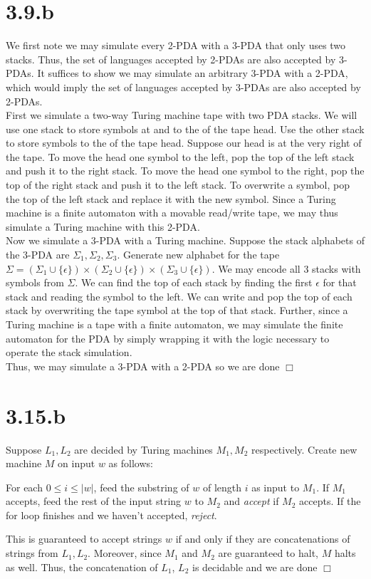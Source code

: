 \documentclass{article}
\newenvironment{myindentpar}[1]
  {\begin{list}{}
          {\setlength{\leftmargin}{#1}\setlength{\rightmargin}{#1}}
          \item[]
  }
  {\end{list}}
\begin{document}
\section*{3.9.b}
We first note we may simulate every 2-PDA with a 3-PDA that only uses two stacks. Thus, the set of languages accepted by 2-PDAs are also accepted by 3-PDAs. It suffices to show we may simulate an arbitrary 3-PDA with a 2-PDA, which would imply the set of languages accepted by 3-PDAs are also accepted by 2-PDAs.\\
First we simulate a two-way Turing machine tape with two PDA stacks. We will use one stack to store symbols at and to the  of the tape head. Use the other stack to store symbols to the  of the tape head. Suppose our head is at the very right of the tape. To move the head one symbol to the left, pop the top of the left stack and push it to the right stack. To move the head one symbol to the right, pop the top of the right stack and push it to the left stack. To overwrite a symbol, pop the top of the left stack and replace it with the new symbol. Since a Turing machine is a finite automaton with a movable read/write tape, we may thus simulate a Turing machine with this 2-PDA.\\
Now we simulate a 3-PDA with a Turing machine. Suppose the stack alphabets of the 3-PDA are $\Sigma_1, \Sigma_2, \Sigma_3$. Generate new alphabet for the tape $\Sigma = (\Sigma_1 \cup \{\epsilon\}) \times (\Sigma_2 \cup \{\epsilon\}) \times (\Sigma_3 \cup \{\epsilon\})$. We may encode all 3 stacks with symbols from $\Sigma$. We can find the top of each stack by finding the first $\epsilon$ for that stack and reading the symbol to the left. We can write and pop the top of each stack by overwriting the tape symbol at the top of that stack. Further, since a Turing machine is a tape with a finite automaton, we may simulate the finite automaton for the PDA by simply wrapping it with the logic necessary to operate the stack simulation.\\
Thus, we may simulate a 3-PDA with a 2-PDA so we are done $\Box$

\section*{3.15.b}
Suppose $L_1, L_2$ are decided by Turing machines $M_1, M_2$ respectively. Create new machine $M$ on input $w$ as follows:
\begin{myindentpar}{1em}
  For each $0 \leqslant i \leqslant |w|$, feed the substring of $w$ of length $i$ as input to $M_1$. If $M_1$ accepts, feed the rest of the input string $w$ to $M_2$ and \textit{accept} if $M_2$ accepts. If the for loop finishes and we haven't accepted, \textit{reject}.
\end{myindentpar}
This is guaranteed to accept strings $w$ if and only if they are concatenations of strings from $L_1,L_2$. Moreover, since $M_1$ and $M_2$ are guaranteed to halt, $M$ halts as well. Thus, the concatenation of $L_1$, $L_2$ is decidable and we are done $\Box$
\end{document}
